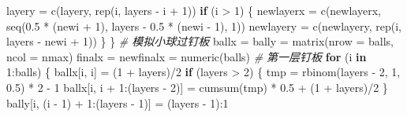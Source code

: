 \documentclass[]{tufte-book}
\newenvironment{Shaded}{}{}
\newcommand{\AttributeTok}[1]{\textcolor[rgb]{0.49,0.56,0.16}{#1}}
\newcommand{\CommentTok}[1]{\textcolor[rgb]{0.38,0.63,0.69}{\textit{#1}}}
\newcommand{\ControlFlowTok}[1]{\textcolor[rgb]{0.00,0.44,0.13}{\textbf{#1}}}
\newcommand{\DecValTok}[1]{\textcolor[rgb]{0.25,0.63,0.44}{#1}}
\newcommand{\FloatTok}[1]{\textcolor[rgb]{0.25,0.63,0.44}{#1}}
\newcommand{\FunctionTok}[1]{\textcolor[rgb]{0.02,0.16,0.49}{#1}}
\newcommand{\NormalTok}[1]{#1}
\newcommand{\OtherTok}[1]{\textcolor[rgb]{0.00,0.44,0.13}{#1}}
\newcommand{\SpecialCharTok}[1]{\textcolor[rgb]{0.25,0.44,0.63}{#1}}
\begin{document}
\begin{Shaded}
\begin{Highlighting}[]
\NormalTok{        layery }\OtherTok{=} \FunctionTok{c}\NormalTok{(layery, }\FunctionTok{rep}\NormalTok{(i, layers }\SpecialCharTok{{-}}\NormalTok{ i }\SpecialCharTok{+} \DecValTok{1}\NormalTok{))}
        \ControlFlowTok{if}\NormalTok{ (i }\SpecialCharTok{\textgreater{}} \DecValTok{1}\NormalTok{) \{}
\NormalTok{                newlayerx }\OtherTok{=} \FunctionTok{c}\NormalTok{(newlayerx, }\FunctionTok{seq}\NormalTok{(}\FloatTok{0.5} \SpecialCharTok{*}\NormalTok{ (newi }\SpecialCharTok{+} \DecValTok{1}\NormalTok{), layers }\SpecialCharTok{{-}} 
                                                     \FloatTok{0.5} \SpecialCharTok{*}\NormalTok{ (newi }\SpecialCharTok{{-}} \DecValTok{1}\NormalTok{), }\DecValTok{1}\NormalTok{))}
\NormalTok{                newlayery }\OtherTok{=} \FunctionTok{c}\NormalTok{(newlayery, }\FunctionTok{rep}\NormalTok{(i, layers }\SpecialCharTok{{-}}\NormalTok{ newi }\SpecialCharTok{+} \DecValTok{1}\NormalTok{))}
\NormalTok{        \}}
\NormalTok{\}}
\CommentTok{\# 模拟小球过钉板}
\NormalTok{ballx }\OtherTok{=}\NormalTok{ bally }\OtherTok{=} \FunctionTok{matrix}\NormalTok{(}\AttributeTok{nrow =}\NormalTok{ balls, }\AttributeTok{ncol =}\NormalTok{ nmax)}
\NormalTok{finalx }\OtherTok{=}\NormalTok{ newfinalx }\OtherTok{=} \FunctionTok{numeric}\NormalTok{(balls)}
\CommentTok{\# 第一层钉板}
\ControlFlowTok{for}\NormalTok{ (i }\ControlFlowTok{in} \DecValTok{1}\SpecialCharTok{:}\NormalTok{balls) \{}
\NormalTok{        ballx[i, i] }\OtherTok{=}\NormalTok{ (}\DecValTok{1} \SpecialCharTok{+}\NormalTok{ layers)}\SpecialCharTok{/}\DecValTok{2}
        \ControlFlowTok{if}\NormalTok{ (layers }\SpecialCharTok{\textgreater{}} \DecValTok{2}\NormalTok{) \{}
\NormalTok{                tmp }\OtherTok{=} \FunctionTok{rbinom}\NormalTok{(layers }\SpecialCharTok{{-}} \DecValTok{2}\NormalTok{, }\DecValTok{1}\NormalTok{, }\FloatTok{0.5}\NormalTok{) }\SpecialCharTok{*} \DecValTok{2} \SpecialCharTok{{-}} \DecValTok{1}
\NormalTok{                ballx[i, i }\SpecialCharTok{+} \DecValTok{1}\SpecialCharTok{:}\NormalTok{(layers }\SpecialCharTok{{-}} \DecValTok{2}\NormalTok{)] }\OtherTok{=} \FunctionTok{cumsum}\NormalTok{(tmp) }\SpecialCharTok{*} \FloatTok{0.5} \SpecialCharTok{+} 
\NormalTok{                        (}\DecValTok{1} \SpecialCharTok{+}\NormalTok{ layers)}\SpecialCharTok{/}\DecValTok{2}
\NormalTok{        \}}
\NormalTok{        bally[i, (i }\SpecialCharTok{{-}} \DecValTok{1}\NormalTok{) }\SpecialCharTok{+} \DecValTok{1}\SpecialCharTok{:}\NormalTok{(layers }\SpecialCharTok{{-}} \DecValTok{1}\NormalTok{)] }\OtherTok{=}\NormalTok{ (layers }\SpecialCharTok{{-}} \DecValTok{1}\NormalTok{)}\SpecialCharTok{:}\DecValTok{1}

\end{Highlighting}
\end{Shaded}
\end{document}
